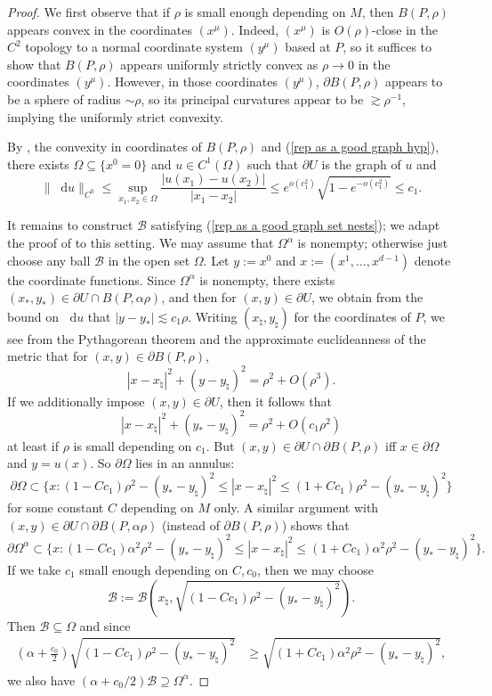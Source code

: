 \documentclass[reqno,11pt]{amsart}
\newcommand*\dif{\mathop{}\!\mathrm{d}}
\theoremstyle{definition}
\numberwithin{equation}{section}
\begin{document}
\begin{proof}
We first observe that if $\rho$ is small enough depending on $M$, then $B(P, \rho)$ appears convex in the coordinates $(x^\mu)$.
Indeed, $(x^\mu)$ is $O(\rho)$-close in the $C^2$ topology to a normal coordinate system $(y^\mu)$ based at $P$, so it suffices to show that $B(P, \rho)$ appears uniformly strictly convex as $\rho \to 0$ in the coordinates $(y^\mu)$.
However, in those coordinates $(y^\mu)$, $\partial B(P, \rho)$ appears to be a sphere of radius $\sim \rho$, so its principal curvatures appear to be $\gtrsim \rho^{-1}$, implying the uniformly strict convexity.

By \cite[Theorem 4.8]{Giusti77}, the convexity in coordinates of $B(P, \rho)$ and (\ref{rep as a good graph hyp}), there exists $\Omega \subseteq \{x^0 = 0\}$ and $u \in C^1(\Omega)$ such that $\partial U$ is the graph of $u$ and 
$$\|\dif u\|_{C^0} \leq \sup_{x_1, x_2 \in \Omega} \frac{|u(x_1) - u(x_2)|}{|x_1 - x_2|} \leq e^{o(c_1^2)}\sqrt{1 - e^{-o(c_1^2)}} \leq c_1.$$

It remains to construct $\mathscr B$ satisfying (\ref{rep as a good graph set nests}); we adapt the proof of \cite[(6.25)]{Giusti77} to this setting.
We may assume that $\Omega^\alpha$ is nonempty; otherwise just choose any ball $\mathscr B$ in the open set $\Omega$.
Let $y := x^0$ and $x := (x^1, \dots, x^{d - 1})$ denote the coordinate functions.
Since $\Omega^\alpha$ is nonempty, there exists $(x_*, y_*) \in \partial U \cap B(P, \alpha \rho)$, and then for $(x, y) \in \partial U$, we obtain from the bound on $\dif u$ that $|y - y_*| \lesssim c_1 \rho$.
Writing $(x_\natural, y_\natural)$ for the coordinates of $P$, we see from the Pythagorean theorem and the approximate euclideanness of the metric that for $(x, y) \in \partial B(P, \rho)$,
$$|x - x_\natural|^2 + (y - y_\natural)^2 = \rho^2 + O(\rho^3).$$
If we additionally impose $(x, y) \in \partial U$, then it follows that 
$$|x - x_\natural|^2 + (y_* - y_\natural)^2 = \rho^2 + O(c_1 \rho^2)$$
at least if $\rho$ is small depending on $c_1$.
But $(x, y) \in \partial U \cap \partial B(P, \rho)$ iff $x \in \partial \Omega$ and $y = u(x)$.
So $\partial \Omega$ lies in an annulus:
$$\partial \Omega \subset \{x: (1 - Cc_1)\rho^2 - (y_* - y_\natural)^2 \leq |x - x_\natural|^2 \leq (1 + Cc_1)\rho^2 - (y_* - y_\natural)^2\}$$
for some constant $C$ depending on $M$ only.
A similar argument with $(x, y) \in \partial U \cap \partial B(P, \alpha \rho)$ (instead of $\partial B(P, \rho)$) shows that
$$\partial \Omega^\alpha \subset \{x: (1 - Cc_1) \alpha^2 \rho^2 - (y_* - y_\natural)^2 \leq |x - x_\natural|^2 \leq (1 + Cc_1)\alpha^2 \rho^2 - (y_* - y_\natural)^2\}.$$
If we take $c_1$ small enough depending on $C, c_0$, then we may choose
$$\mathscr B := \mathscr B\left(x_\natural, \sqrt{(1 - Cc_1)\rho^2 - (y_* - y_\natural)^2}\right).$$
Then $\mathscr B \subseteq \Omega$ and since 
\begin{align*}
\left(\alpha + \frac{c_0}{2}\right) \sqrt{(1 - Cc_1)\rho^2 - (y_* - y_\natural)^2} &\geq \sqrt{(1 + Cc_1)\alpha^2 \rho^2 - (y_* - y_\natural)^2},
\end{align*}
we also have $(\alpha + c_0/2) \mathscr B \supseteq \Omega^\alpha$.
\end{proof}
\end{document}
